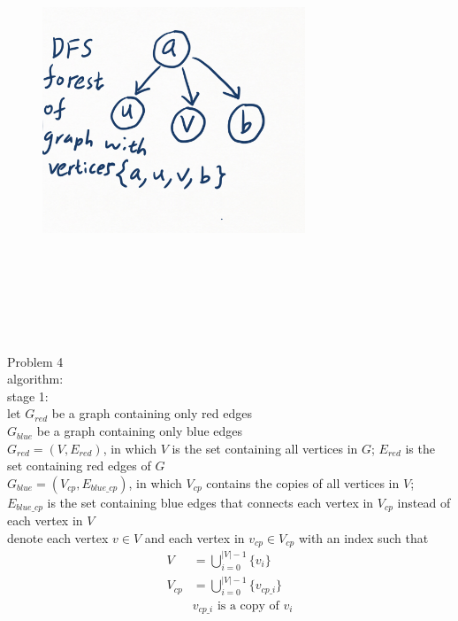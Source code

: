 \documentclass[12pt,border=4pt,multi]{article} %
\begin{document}
\begin{figure}[h!]
	\centering
	\includegraphics[width=0.7\textwidth, height=0.75\textwidth]{3b2} %
\end{figure}
\\
\\
\\
\\
\newpage
\noindent
\\
\newpage
\noindent
\\
\newpage
\noindent
Problem 4\\
algorithm:\\
stage 1:\\
let $G_{red}$ be a graph containing only red edges\\ 
$G_{blue}$ be a graph containing only blue edges\\
$G_{red} = (V, E_{red})$, in which $V$ is the set containing all vertices in $G$; $E_{red}$ is the set containing red edges of $G$\\
$G_{blue} = (V_{cp}, E_{blue\_cp})$, in which $V_{cp}$ contains the copies of all vertices in $V$; $E_{blue\_cp}$ is the set containing blue edges that connects each vertex in $V_{cp}$ instead of each vertex in $V$\\
denote each vertex $v \in V$ and each vertex in $v_{cp} \in V_{cp}$ with an index such that
\begin{align*}
V &= \bigcup_{i = 0}^{|V| - 1} \{v_i\}\\
V_{cp} &= \bigcup_{i = 0}^{|V| - 1} \{v_{cp\_i}\}\\
&v_{cp\_i}\text{ is a copy of }v_i\\
\end{align*}
\end{document}
